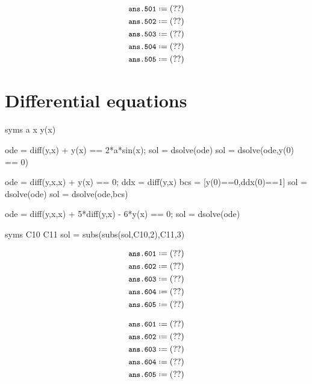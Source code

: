 \documentclass[12pt]{matlatex}
\begin{document}
\begin{align*}
   &\mat*{ans.501}\\
   &\mat*{ans.502}\\
   &\mat*{ans.503}\\
   &\mat*{ans.504}\\
   &\mat*{ans.505}
\end{align*}

\clearpage

\section*{Differential equations}

\begin{minipage}[t]{0.65\textwidth}
\begin{matlab}
   syms a x y(x)

   ode = diff(y,x) + y(x) == 2*a*sin(x);
   sol = dsolve(ode)                               %
   sol = dsolve(ode,y(0) == 0)                     %

   ode = diff(y,x,x) + y(x) == 0;
   ddx = diff(y,x)
   bcs = [y(0)==0,ddx(0)==1]
   sol = dsolve(ode)                               %
   sol = dsolve(ode,bcs)                           %

   ode = diff(y,x,x) + 5*diff(y,x) - 6*y(x) == 0;
   sol = dsolve(ode)                               %

   syms C10 C11
   sol = subs(subs(sol,C10,2),C11,3)                %
\end{matlab}
\end{minipage}
\hskip 1cm
\begin{minipage}[t]{0.35\textwidth}
\begin{latex}
   \begin{align*}
      &\mat*{ans.601}\\
      &\mat*{ans.602}\\
      &\mat*{ans.603}\\
      &\mat*{ans.604}\\
      &\mat*{ans.605}
   \end{align*}
\end{latex}
\end{minipage}

\begin{align*}
   &\mat*{ans.601}\\
   &\mat*{ans.602}\\
   &\mat*{ans.603}\\
   &\mat*{ans.604}\\
   &\mat*{ans.605}
\end{align*}
\end{document}
